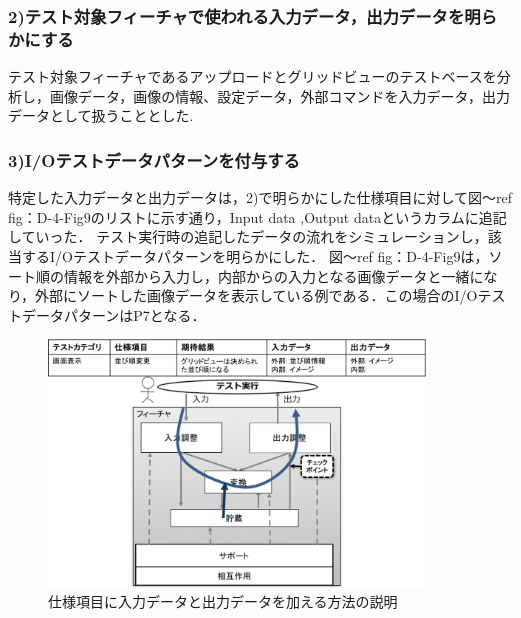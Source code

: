 \documentclass[a4paper,12pt]{jreport}
\begin{document}
\subsubsection{2)テスト対象フィーチャで使われる入力データ，出力データを明らかにする}
テスト対象フィーチャであるアップロードとグリッドビューのテストベースを分析し，画像データ，画像の情報、設定データ，外部コマンドを入力データ，出力データとして扱うこととした.

\subsubsection{3)I/Oテストデータパターンを付与する}
特定した入力データと出力データは，2)で明らかにした仕様項目に対して図〜ref {fig：D-4-Fig9}のリストに示す通り，Input data ,Output dataというカラムに追記していった．
テスト実行時の追記したデータの流れをシミュレーションし，該当するI/Oテストデータパターンを明らかにした．
図〜ref {fig：D-4-Fig9}は，ソート順の情報を外部から入力し，内部からの入力となる画像データと一緒になり，外部にソートした画像データを表示している例である．この場合のI/OテストデータパターンはP7となる．
   \begin{figure}[htbp]
  \begin{center}
  \includegraphics[width=10cm]{./image/D-4-Fig9.png}
  \caption{仕様項目に入力データと出力データを加える方法の説明}
  \label{fig:D-4-Fig9}
  \end{center}
   \end{figure}
\end{document}
